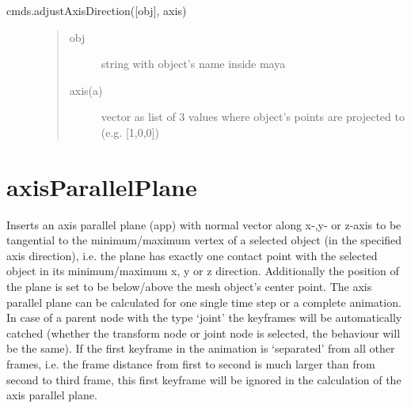 \documentclass[letterpaper,10pt,english]{sphinxmanual}
\begin{document}
 cmds.adjustAxisDirection({[}obj{]}, axis)
\begin{description}
\item[{}] \leavevmode\begin{quote}\begin{description}
\item[{obj}] \leavevmode
string with object’s name inside maya

\item[{axis(a)}] \leavevmode
vector as list of 3 values where object’s points are projected to (e.g. {[}1,0,0{]})

\end{description}\end{quote}

\item[{}] \leavevmode
\begin{sphinxVerbatim}[commandchars=\\\{\}]
  \PYG{p}{[}\PYG{p}{]}
\end{sphinxVerbatim}

\end{description}


\section{axisParallelPlane}
\label{\detokenize{pk_src.axisParallelPlane:axisparallelplane}}\label{\detokenize{pk_src.axisParallelPlane::doc}}\label{\detokenize{pk_src.axisParallelPlane:id1}}
{\hyperref[\detokenize{index:commands}]{}}
\label{\detokenize{pk_src.axisParallelPlane:module-pk_src.axisParallelPlane}}
Inserts an axis parallel plane (app) with normal vector along x-,y- or z-axis to be tangential to the minimum/maximum vertex of a selected object (in the specified axis direction), i.e. the plane has exactly one contact point with the selected object in its minimum/maximum x, y or z direction. Additionally the position of the plane is set to be below/above the mesh object’s center point.
The axis parallel plane can be calculated for one single time step or a complete animation. In case of a parent node with the type ‘joint’ the keyframes will be automatically catched (whether the transform node or joint node is selected, the behaviour will be the same). If the first keyframe in the animation is ‘separated’ from all other frames, i.e. the frame distance from first to second is much larger than from second to third frame, this first keyframe will be ignored in the calculation of the axis parallel plane.
\end{document}
